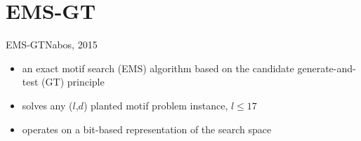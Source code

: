 \documentclass[pdf,xcolor={dvipsnames}]{beamer}
\begin{document}
\section{EMS-GT}
	\begin{frame}{EMS-GT}{Nabos, 2015}
		\begin{itemize}
		\item an exact motif search (EMS) algorithm based on the candidate generate-and-test (GT) principle\newline
		\item solves any ($l$,$d$) planted motif problem instance, $l \leq 17$ \newline
		\item operates on a bit-based representation of the search space
		\end{itemize}
		\end{frame}
\end{document}

